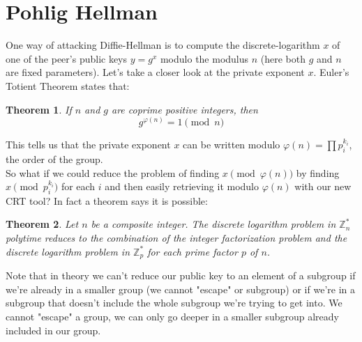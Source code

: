 \documentclass[a4paper,11pt,twocolumn]{article}
\newtheorem{theorem}{Theorem}
\begin{document}
\newpage

\appendix 

\section{Pohlig Hellman}

One way of attacking Diffie-Hellman is to compute the discrete-logarithm $x$ of one of the peer's public keys $y = g^{x}$ modulo the modulus $n$ (here both $g$ and $n$ are fixed parameters). Let's take a closer look at the private exponent $x$. Euler's Totient Theorem states that:

\begin{theorem}
If $n$ and $g$ are coprime positive integers, then
\[ g^{\varphi(n)} = 1 \pmod{n} \]
\end{theorem}

This tells us that the private exponent $x$ can be written modulo $\varphi(n) = \prod p_i^{k_i}$, the order of the group.\\

So what if we could reduce the problem of finding $x \pmod{\varphi(n)}$ by finding $x \pmod{p_i^{k_i}}$ for each $i$ and then easily retrieving it modulo $\varphi(n)$ with our new CRT tool? In fact a theorem says it is possible:

\begin{theorem}
Let $n$ be a composite integer. The discrete logarithm problem in $\mathbb{Z}^*_n$ polytime reduces to the combination of the integer factorization problem and the discrete logarithm problem in $\mathbb{Z}^*_p$ for each prime factor $p$ of $n$.
\end{theorem}

%

Note that in theory we can't reduce our public key to an element of a subgroup if we're already in a smaller group (we cannot "escape" or subgroup) or if we're in a subgroup that doesn't include the whole subgroup we're trying to get into. We cannot "escape" a group, we can only go deeper in a smaller subgroup already included in our group.
\end{document}
